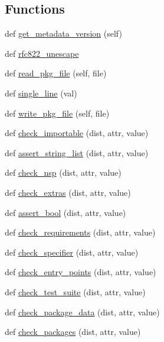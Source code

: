 \subsection*{Functions}
\begin{DoxyCompactItemize}
\item 
def \hyperlink{namespacesetuptools_1_1dist_abd7551d46c5105fd55cc74ccfe65353e}{get\+\_\+metadata\+\_\+version} (self)
\item 
def \hyperlink{namespacesetuptools_1_1dist_ae1746a318edf074220d39aec32503133}{rfc822\+\_\+unescape}
\item 
def \hyperlink{namespacesetuptools_1_1dist_a015118a04a9d5512799dde5ce0fb2a28}{read\+\_\+pkg\+\_\+file} (self, file)
\item 
def \hyperlink{namespacesetuptools_1_1dist_aeeb9a8d6c28dcbc32257bb2ef8027317}{single\+\_\+line} (val)
\item 
def \hyperlink{namespacesetuptools_1_1dist_a37d5624a94cb0491805ecd6dddba85bc}{write\+\_\+pkg\+\_\+file} (self, file)
\item 
def \hyperlink{namespacesetuptools_1_1dist_a34c7bc2fb87e3610638e5e71cbbebb9c}{check\+\_\+importable} (dist, attr, value)
\item 
def \hyperlink{namespacesetuptools_1_1dist_adef1021a792040663598a45748f8cf95}{assert\+\_\+string\+\_\+list} (dist, attr, value)
\item 
def \hyperlink{namespacesetuptools_1_1dist_a328a9faed0ff4a67c79bf755bb8aa9c5}{check\+\_\+nsp} (dist, attr, value)
\item 
def \hyperlink{namespacesetuptools_1_1dist_a67dcebb09dd6485db2f8850dfe3045f3}{check\+\_\+extras} (dist, attr, value)
\item 
def \hyperlink{namespacesetuptools_1_1dist_a6248cc8e03decc97c768ba201e3a3244}{assert\+\_\+bool} (dist, attr, value)
\item 
def \hyperlink{namespacesetuptools_1_1dist_a29a45dac0119a4bfaf9412a216a6fd41}{check\+\_\+requirements} (dist, attr, value)
\item 
def \hyperlink{namespacesetuptools_1_1dist_ad16e6b95535ea80403747b5ef21cd66d}{check\+\_\+specifier} (dist, attr, value)
\item 
def \hyperlink{namespacesetuptools_1_1dist_a392bacff0b7eefe57d55ac19706234c1}{check\+\_\+entry\+\_\+points} (dist, attr, value)
\item 
def \hyperlink{namespacesetuptools_1_1dist_a6a197d513c80b32120484d6c7dd29066}{check\+\_\+test\+\_\+suite} (dist, attr, value)
\item 
def \hyperlink{namespacesetuptools_1_1dist_a1c396158f859904995bff0393651fe59}{check\+\_\+package\+\_\+data} (dist, attr, value)
\item 
def \hyperlink{namespacesetuptools_1_1dist_ae1e38f1e592688eba2adffd9498dba7b}{check\+\_\+packages} (dist, attr, value)
\end{DoxyCompactItemize}
